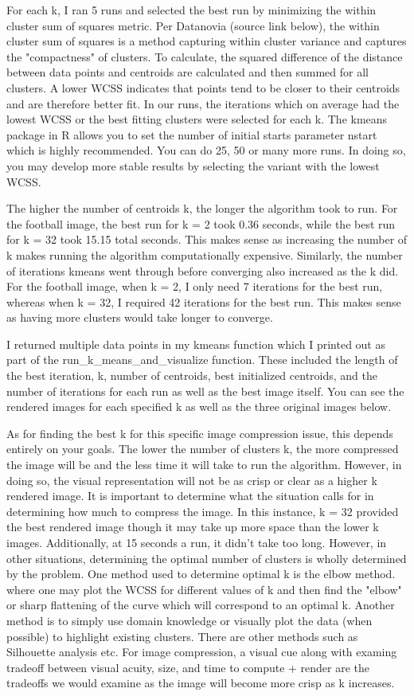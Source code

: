\documentclass[twoside,10pt]{article}
\begin{document}
For each k, I ran 5 runs and selected the best run by minimizing the within cluster sum of squares metric.
Per Datanovia (source link below), the within cluster sum of squares is a method capturing within cluster variance
and captures the "compactness" of clusters. To calculate, the squared difference of the distance between
data points and centroids are calculated and then summed for all clusters. A lower WCSS indicates that points
tend to be closer to their centroids and are therefore better fit. In our runs, the iterations which on average
had the lowest WCSS or the best fitting clusters were selected for each k. The kmeans package in R allows you
to set the number of initial starts parameter nstart which is highly recommended. You can do 25, 50 or many more
runs. In doing so, you may develop more stable results by selecting the variant with the lowest WCSS.

The higher the number of centroids k, the longer the algorithm took to run. For the football image, the best
run for k = 2 took 0.36 seconds, while the best run for k = 32 took 15.15 total seconds. This makes
sense as increasing the number of k makes running the algorithm computationally expensive. Similarly, the number
of iterations kmeans went through before converging also increased as the k did. For the football image,
when k = 2, I only need 7 iterations for the best run, whereas when k = 32, I required 42 iterations for the best
run. This makes sense as having more clusters would take longer to converge.

I returned multiple data points in my kmeans function which I printed out as part of the run_k_means_and_visualize
function. These included the length of the best iteration, k, number of centroids, best initialized centroids,
and the number of iterations for each run as well as the best image itself. You can see the rendered images
for each specified k as well as the three original images below.

As for finding the best k for this specific image compression issue, this depends entirely on your goals. The lower
the number of clusters k, the more compressed the image will be and the less time it will take to run the algorithm.
However, in doing so, the visual representation will not be as crisp or clear as a higher k rendered image. It is
important to determine what the situation calls for in determining how much to compress the image. In this instance,
k = 32 provided the best rendered image though it may take up more space than the lower k images. Additionally,
at 15 seconds a run, it didn't take too long. However, in other situations, determining the optimal number of clusters
is wholly determined by the problem. One method used to determine optimal k is the elbow method. where one may
plot the WCSS for different values of k and then find the "elbow" or sharp flattening of the curve which will
correspond to an optimal k. Another method is to simply use domain knowledge or visually plot the data (when possible)
to highlight existing clusters. There are other methods such as Silhouette analysis etc. For image compression,
a visual cue along with examing tradeoff between visual acuity, size, and time to compute + render are the
tradeoffs we would examine as the image will become more crisp as k increases.
\end{document}
